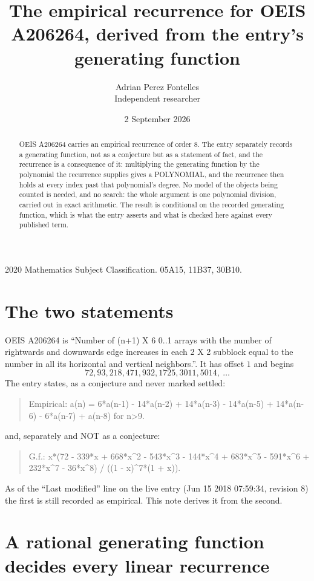 \documentclass[11pt,a4paper]{article}
\title{The empirical recurrence for OEIS A206264, derived from the entry's generating function}
\author{Adrian Perez Fontelles\\ \small Independent researcher}
\date{2 September 2026}
\theoremstyle{plain}
\theoremstyle{definition}
\begin{document}
\maketitle

\begin{abstract}
OEIS A206264 carries an empirical recurrence of order $8$. The entry separately records a
generating function, not as a conjecture but as a statement of fact, and the recurrence is a
consequence of it: multiplying the generating function by the polynomial the recurrence
supplies gives a POLYNOMIAL, and the recurrence then holds at every index past that
polynomial's degree. No model of the objects being counted is needed, and no search: the
whole argument is one polynomial division, carried out in exact arithmetic. The result is
conditional on the recorded generating function, which is what the entry asserts and what is
checked here against every published term.
\end{abstract}

\noindent\small 2020 Mathematics Subject Classification. 05A15, 11B37, 30B10.\normalsize

\section{The two statements}

OEIS A206264 is ``Number of (n+1) X 6 0..1 arrays with the number of rightwards and downwards edge increases in each 2 X 2 subblock equal to the number in all its horizontal and vertical neighbors.''. It has offset $1$ and begins
\[
72, 93, 218, 471, 932, 1725, 3011, 5014,\ \dots
\]
The entry states, as a conjecture and never marked settled:
\begin{quote}
Empirical: a(n) = 6*a(n-1) - 14*a(n-2) + 14*a(n-3) - 14*a(n-5) + 14*a(n-6) - 6*a(n-7) + a(n-8) for n>9.
\end{quote}
and, separately and NOT as a conjecture:
\begin{quote}
G.f.: x*(72 - 339*x + 668*x\^{}2 - 543*x\^{}3 - 144*x\^{}4 + 683*x\^{}5 - 591*x\^{}6 + 232*x\^{}7 - 36*x\^{}8) / ((1 - x)\^{}7*(1 + x)).
\end{quote}
As of the ``Last modified'' line on the live entry (Jun 15 2018 07:59:34, revision 8) the first is still
recorded as empirical. This note derives it from the second.

\section{A rational generating function decides every linear recurrence}
\end{document}
